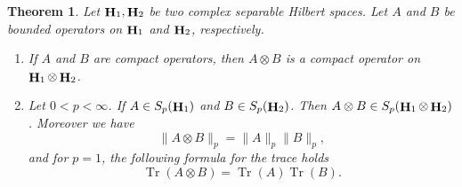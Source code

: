 \documentclass[a4paper,12pt,reqno]{amsart}
\newtheorem{thm}{Theorem}[section]
\theoremstyle{definition}
\theoremstyle{remark}
\numberwithin{equation}{section}
\DeclareMathOperator{\Tr}{Tr}
\DeclareMathOperator{\Hi}{{\bf H}}
\begin{document}
\begin{thm}\label{scprt} Let $\Hi_1, \Hi_2$ be  two complex separable Hilbert spaces. Let $A$ and $B$ be bounded operators  on $ \Hi_1$ and  $ \Hi_2$, respectively.
	\begin{enumerate}
		\item If $A$ and $B$ are compact  operators, then $A\otimes B$ is a compact operator on  $ \Hi_1\otimes \Hi_2$. 

\item Let $0<p<\infty$. If $A\in S_p(\Hi_1)$ and $B\in S_p(\Hi_2)$. Then  $A\otimes B\in S_p( \Hi_1\otimes \Hi_2)$. Moreover we have
\[\|A\otimes B\|_p=\|A\|_p\|B\|_p,\]
and for $p=1$, the following formula for the trace holds
	\[\Tr (A\otimes B)=\Tr (A)\Tr (B).\]
\end{enumerate}
\end{thm}
\end{document}
